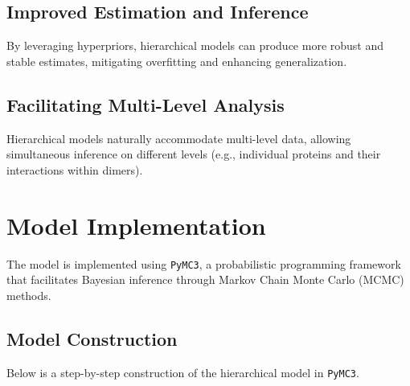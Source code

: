 \documentclass[12pt]{article}
\begin{document}
\subsection{Improved Estimation and Inference}
By leveraging hyperpriors, hierarchical models can produce more robust and stable estimates, mitigating overfitting and enhancing generalization.

\subsection{Facilitating Multi-Level Analysis}
Hierarchical models naturally accommodate multi-level data, allowing simultaneous inference on different levels (e.g., individual proteins and their interactions within dimers).

\section{Model Implementation}

The model is implemented using \texttt{PyMC3}, a probabilistic programming framework that facilitates Bayesian inference through Markov Chain Monte Carlo (MCMC) methods.

\subsection{Model Construction}
Below is a step-by-step construction of the hierarchical model in \texttt{PyMC3}.
\end{document}
